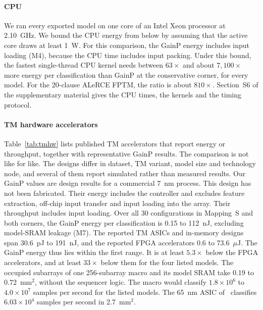 \documentclass[preprint,review,12pt]{elsarticle}
\newcommand{\gainp}{GainP}
\newcommand{\hyp}[1]{#1}   %
\newcommand{\wosnew}[1]{#1}   %
\begin{document}
\paragraph{CPU}
We ran every exported model on one core of an Intel Xeon processor at 2.10~GHz.
\wosnew{We bound the CPU energy from below by assuming that the active core draws at least 1~W.}
\hyp{For this comparison, the \gainp{} energy includes input loading (M4), because the CPU time includes input packing. Under this bound, the fastest single-thread CPU kernel needs between $63\times$ and about $7{,}100\times$ more energy per classification than \gainp{} at the conservative corner, for every model. For the 20-clause ALeRCE FPTM, the ratio is about $810\times$.}
\wosnew{Section~S6 of the supplementary material gives the CPU times, the kernels and the timing protocol.}

\paragraph{TM hardware accelerators}
Table~\ref{tab:tmhw} lists published TM accelerators that report energy or throughput, together with representative \gainp{} results.
The comparison is not like for like. The designs differ in dataset, TM variant, model size and technology node, and several of them report simulated rather than measured results.
Our \gainp{} values are design results for a commercial 7~nm process. This design has not been fabricated. Their energy includes the controller and excludes feature extraction, off-chip input transfer and input loading into the array. Their throughput includes input loading.
\hyp{Over all 30 configurations in Mapping~S and both corners, the \gainp{} energy per classification is 0.15 to 112~nJ, excluding model-SRAM leakage (M7).} The reported TM ASICs and in-memory designs span 30.6~pJ to 191~nJ, and the reported FPGA accelerators 0.6 to 73.6~$\mu$J. \hyp{The \gainp{} energy thus lies within the first range. It is at least $5.3\times$ below the FPGA accelerators, and at least $33\times$ below them for the four listed models.
The occupied subarrays of one 256-subarray macro and its model SRAM take 0.19 to 0.72~mm$^2$, without the sequencer logic. The macro would classify $1.8\times10^6$ to $4.0\times10^7$ samples per second for the listed models.} The 65~nm ASIC of~\cite{tunheim2026asic} classifies $6.03\times10^4$ samples per second in 2.7~mm$^2$.
\end{document}
